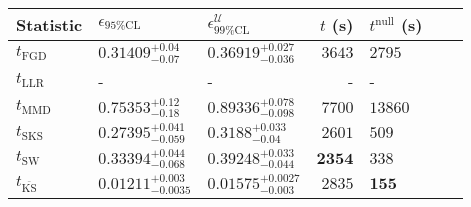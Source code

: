 \begin{tabular}{l|llr|llr}
	Statistic & $\epsilon_{95\%\mathrm{CL}}$ & $\epsilon^    {\mathcal{U}}_{99\%\mathrm{CL}}$ & $t$ (s) & $t^{\mathrm{null}}$ (s) \\
	\midrule
	$t_{\mathrm{FGD}}$ & $0.31409_{-0.07}^{+0.04}$ & $0.36919_{-0.036}^{+0.027}$ & $3643$ & $2795$ \\
	$t_{\mathrm{LLR}}$ & - & - & - & - \\
	$t_{\mathrm{MMD}}$ & $0.75353_{-0.18}^{+0.12}$ & $0.89336_{-0.098}^{+0.078}$ & $7700$ & $13860$ \\
	$t_{\mathrm{SKS}}$ & $0.27395_{-0.059}^{+0.041}$ & $0.3188_{-0.04}^{+0.033}$ & $2601$ & $509$ \\
	$t_{\mathrm{SW}}$ & $0.33394_{-0.068}^{+0.044}$ & $0.39248_{-0.044}^{+0.033}$ & ${\mathbf{2354}}$ & $338$ \\
	$t_{\overline{\mathrm{KS}}}$ & ${\mathbf{0.01211_{-0.0035}^{+0.003}}}$ & ${\mathbf{0.01575_{-0.003}^{+0.0027}}}$ & $2835$ & ${\mathbf{155}}$ \\
	\bottomrule
\end{tabular}